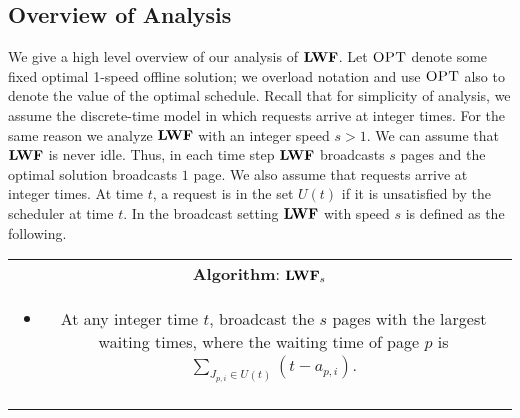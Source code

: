 \documentclass[11pt]{article}
\newcommand{\opt}{\textrm{\sc OPT}}
\newcommand{\spbox}{-4mm}
\begin{document}
\begin{titlepage}
\subsection{Overview of Analysis}\vspace{-2mm}
\label{sec:overview} We give a high level overview of our analysis of
${\texttt{\bf{LWF}}}$.  Let $\opt$ denote some fixed optimal 1-speed offline
solution; we overload notation and use $\opt$ also to denote the value
of the optimal schedule. Recall that for simplicity of analysis, we
assume the discrete-time model in which requests arrive at integer
times. For the same reason we analyze ${\texttt{\bf{LWF}}}$ with an integer speed $s
> 1$. We can assume that ${\texttt{\bf{LWF}}}$ is never idle. Thus, in each time step
${\texttt{\bf{LWF}}}$ broadcasts $s$ pages and the optimal solution broadcasts $1$
page. We also assume that requests arrive at integer times.  At time
$t$, a request is in the set $U(t)$ if it is unsatisfied by the
scheduler at time $t$. In the broadcast setting ${\texttt{\bf{LWF}}}$ with speed $s$
is defined as the following. \vspace{\spbox}\vspace{-2mm}

\begin{center}
\begin{tabular}[r]{|c|}
\hline
\textbf{Algorithm}: ${\texttt{\bf{LWF}}}_s$ \\

\begin{minipage}{\textwidth}
\begin{itemize}
\item At any integer time $t$, broadcast the $s$ pages with the
  largest waiting times, where the waiting time of page $p$ is
  $\sum_{J_{p,i} \in U(t)} (t-a_{p,i})$.
\end{itemize}
\vspace{-7mm}
\end{minipage}\\\\

\hline
\end{tabular}
\end{center}\vspace{-2mm}


\end{titlepage}
\end{document}
